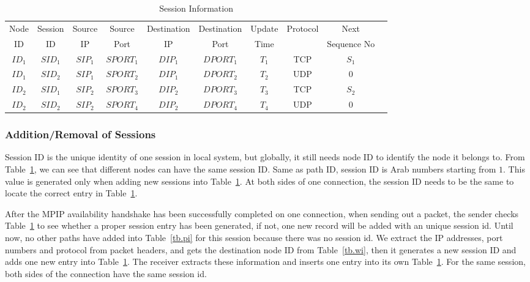 \begin{table}
\caption{\label{tb.ss}Session Information}
\centering
\begin{tabular}{|c|c|c|c|c|c|c|c|c|c|}
\hline
Node  & Session &  Source &  Source & Destination & Destination & Update  & Protocol  &    Next      \\
  ID  &   ID    &    IP   &   Port  &     IP      &    Port     &  Time   &           &  Sequence No \\
\hline
${ID}_1$&${SID}_1$&${SIP}_{1}$&${SPORT}_{1}$&${DIP}_{1}$&${DPORT}_{1}$&$T_1$&TCP&$S_1$               \\
\hline
${ID}_1$&${SID}_2$&${SIP}_{1}$&${SPORT}_{2}$&${DIP}_{1}$&${DPORT}_{2}$&$T_2$&UDP&$0$                 \\
\hline
${ID}_2$&${SID}_1$&${SIP}_{2}$&${SPORT}_{3}$&${DIP}_{2}$&${DPORT}_{3}$&$T_3$&TCP&$S_2$              \\
\hline
${ID}_2$&${SID}_2$&${SIP}_{2}$&${SPORT}_{4}$&${DIP}_{2}$&${DPORT}_{4}$&$T_4$&UDP&$0$                 \\
\hline
\end{tabular}
\end{table}


\subsubsection{Addition/Removal of Sessions}

Session ID is the unique identity of one session in local system, but globally, it still needs node ID to identify the node it belongs to. From Table~\ref{tb.ss}, we can see that different nodes can have the same session ID. Same as path ID, session ID is Arab numbers starting from $1$. This value is generated only when adding new sessions into Table~\ref{tb.ss}. At both sides of one connection, the session ID needs to be the same to locate the correct entry in Table~\ref{tb.ss}.

After the MPIP availability handshake has been successfully completed on one connection, when sending out a packet, the sender checks Table~\ref{tb.ss} to see whether a proper session entry has been generated, if not, one new record will be added with an unique session id. Until now, no other paths have added into Table~\ref{tb.pi} for this session because there was no session id. We extract the IP addresses, port numbers and protocol from packet headers, and gets the destination node ID from Table~\ref{tb.wi}, then it generates a new session ID and adds one new entry into Table~\ref{tb.ss}. The receiver extracts these information and inserts one entry into its own Table~\ref{tb.ss}. For the same session, both sides of the connection have the same session id.

